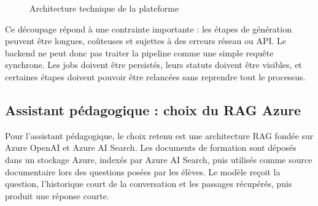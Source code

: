\documentclass[12pt,a4paper]{article}
\begin{document}
\begin{figure}[h]
\centering
{}
\caption{Architecture technique de la plateforme}
\end{figure}

Ce découpage répond à une contrainte importante : les étapes de génération peuvent être
longues, coûteuses et sujettes à des erreurs réseau ou API. Le backend ne peut donc pas
traiter la pipeline comme une simple requête synchrone. Les jobs doivent être persistés,
leurs statuts doivent être visibles, et certaines étapes doivent pouvoir être relancées sans
reprendre tout le processus.

\subsection{Assistant pédagogique : choix du RAG Azure}

Pour l'assistant pédagogique, le choix retenu est une architecture RAG fondée sur Azure
OpenAI et Azure AI Search. Les documents de formation sont déposés dans un stockage
Azure, indexés par Azure AI Search, puis utilisés comme source documentaire lors des
questions posées par les élèves. Le modèle reçoit la question, l'historique court de la
conversation et les passages récupérés, puis produit une réponse courte.
\end{document}
